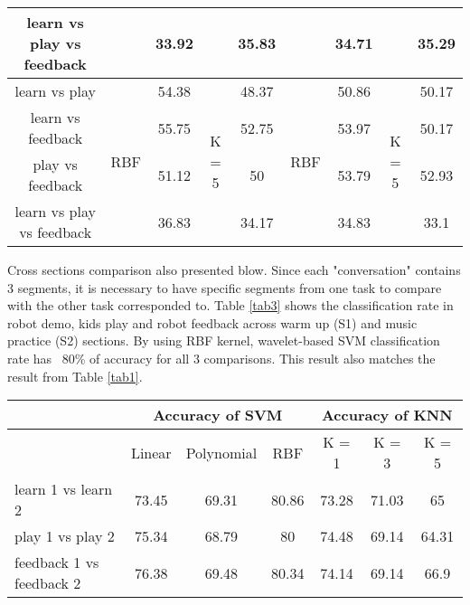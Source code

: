 \documentclass[conference]{IEEEtran}
\begin{document}
\begin{table*}[tbp]
\begin{center}
\begin{tabular}{ccccccccc}
		learn vs play vs feedback                                 &                             & 33.92    &                        & 35.83    &                             & 34.71    &                        & 35.29    \\
		\hline
		learn vs play                                   & \multirow{4}{*}{RBF}        & 54.38    & \multirow{4}{*}{K = 5} & 48.37    & \multirow{4}{*}{RBF}        & 50.86    & \multirow{4}{*}{K = 5} & 50.17    \\
		learn vs feedback                                   &                             & 55.75    &                        & 52.75    &                             & 53.97    &                        & 50.17    \\
		play vs feedback                                   &                             & 51.12    &                        & 50       &                             & 53.79    &                        & 52.93    \\
		learn vs play vs feedback                                 &                             & 36.83    &                        & 34.17    &                             & 34.83    &                        & 33.1    \\
		\hline
	\end{tabular}
	\label{tab2}
\end{center}
\end{table*}

Cross sections comparison also presented blow. Since each "conversation" contains 3 segments, it is 
necessary to have specific segments from one task to compare with the other task corresponded to. 
Table \ref{tab3} shows the classification rate in robot demo, kids play and robot feedback across
warm up (S1) and music practice (S2) sections. By using RBF kernel, wavelet-based SVM classification rate has
~80\% of accuracy for all 3 comparisons. This result also matches the result from Table \ref{tab1}. 

\begin{table*}[tbp]
	\caption{Emotion Change in Different Tasks}
	\begin{center}
		\begin{tabular}{lcccccc}
			\multicolumn{1}{c}{\multirow{2}{*}{}} & \multicolumn{3}{c}{Accuracy of SVM} & \multicolumn{3}{c}{Accuracy of KNN} \\
			\hline
			\multicolumn{1}{c}{}                  & Linear   & Polynomial    & RBF    & K = 1   & K = 3     & K = 5     \\
			\hline
			learn 1 vs learn 2                                 & 73.45    & 69.31   & 80.86  & 73.28   & 71.03   & 65      \\
			\hline
			play 1 vs play 2                                 & 75.34    & 68.79   & 80     & 74.48   & 69.14   & 64.31   \\
			\hline
			feedback 1 vs feedback 2                                 & 76.38    & 69.48   & 80.34  & 74.14   & 69.14   & 66.9   
		\end{tabular}
		\label{tab3}
	\end{center}
\end{table*}
\end{document}
